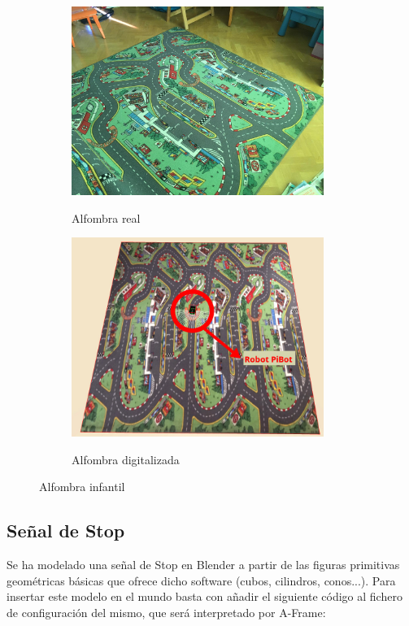 \documentclass{report}
\begin{document}
\renewcommand{\figurename}{Figura}		
\begin{figure}[!h]
\centering
  \begin{subfigure}[b]{0.49\textwidth}
  \centering
    \includegraphics[width=0.9\textwidth, height=0.7\textwidth]{images/cap4/alfombra-real.jpeg}
    \label{fig:f1}
    \caption{Alfombra real}
  \end{subfigure}
  \hfill
  \begin{subfigure}[b]{0.49\textwidth}
  \centering
    \includegraphics[width=0.9\textwidth, height=0.7\textwidth]{images/cap4/alfombra.jpg}
    \label{fig:f2}
    \caption{Alfombra digitalizada}
  \end{subfigure}
  \caption{Alfombra infantil}
\end{figure}


\newpage
\subsection{Señal de Stop}
Se ha modelado una señal de Stop en Blender a partir de las figuras primitivas geométricas básicas que ofrece dicho software (cubos, cilindros, conos...). Para insertar este modelo en el mundo basta con añadir el siguiente código al fichero de configuración del mismo, que será interpretado por A-Frame:
\end{document}
